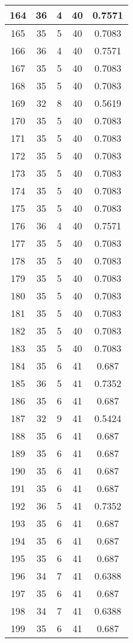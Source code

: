 \documentclass[letterpaper, 12pt]{article}
\begin{document}
\begin{longtable}{|c|c|c|c|c|}
\hline
164 & 36 & 4 & 40 & 0.7571 \\
\hline
165 & 35 & 5 & 40 & 0.7083 \\
\hline
166 & 36 & 4 & 40 & 0.7571 \\
\hline
167 & 35 & 5 & 40 & 0.7083 \\
\hline
168 & 35 & 5 & 40 & 0.7083 \\
\hline
169 & 32 & 8 & 40 & 0.5619 \\
\hline
170 & 35 & 5 & 40 & 0.7083 \\
\hline
171 & 35 & 5 & 40 & 0.7083 \\
\hline
172 & 35 & 5 & 40 & 0.7083 \\
\hline
173 & 35 & 5 & 40 & 0.7083 \\
\hline
174 & 35 & 5 & 40 & 0.7083 \\
\hline
175 & 35 & 5 & 40 & 0.7083 \\
\hline
176 & 36 & 4 & 40 & 0.7571 \\
\hline
177 & 35 & 5 & 40 & 0.7083 \\
\hline
178 & 35 & 5 & 40 & 0.7083 \\
\hline
179 & 35 & 5 & 40 & 0.7083 \\
\hline
180 & 35 & 5 & 40 & 0.7083 \\
\hline
181 & 35 & 5 & 40 & 0.7083 \\
\hline
182 & 35 & 5 & 40 & 0.7083 \\
\hline
183 & 35 & 5 & 40 & 0.7083 \\
\hline
184 & 35 & 6 & 41 & 0.687 \\
\hline
185 & 36 & 5 & 41 & 0.7352 \\
\hline
186 & 35 & 6 & 41 & 0.687 \\
\hline
187 & 32 & 9 & 41 & 0.5424 \\
\hline
188 & 35 & 6 & 41 & 0.687 \\
\hline
189 & 35 & 6 & 41 & 0.687 \\
\hline
190 & 35 & 6 & 41 & 0.687 \\
\hline
191 & 35 & 6 & 41 & 0.687 \\
\hline
192 & 36 & 5 & 41 & 0.7352 \\
\hline
193 & 35 & 6 & 41 & 0.687 \\
\hline
194 & 35 & 6 & 41 & 0.687 \\
\hline
195 & 35 & 6 & 41 & 0.687 \\
\hline
196 & 34 & 7 & 41 & 0.6388 \\
\hline
197 & 35 & 6 & 41 & 0.687 \\
\hline
198 & 34 & 7 & 41 & 0.6388 \\
\hline
199 & 35 & 6 & 41 & 0.687 \\
\hline
\end{longtable}
\end{document}
